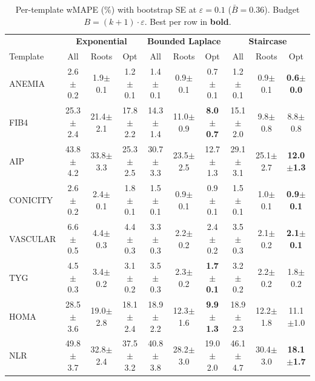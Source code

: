 \providecommand{\pmstd}[1]{{\scriptsize $\pm$#1}}

\begin{table}[t]
\centering
\setlength{\tabcolsep}{2.8pt}
\small
\caption{Per-template wMAPE (\%) with bootstrap SE at $\varepsilon = 0.1$ ($\bar{B} = 0.36$). Budget $B = (k+1) \cdot \varepsilon$. Best per row in \textbf{bold}.}
\label{tab:rq1_kplus1_per_tmpl_wmape}
\begin{tabular}{l|ccc|ccc|ccc}
\toprule
& \multicolumn{3}{c|}{\textbf{Exponential}} & \multicolumn{3}{c|}{\textbf{Bounded Laplace}} & \multicolumn{3}{c}{\textbf{Staircase}} \\
Template & All & Roots & Opt & All & Roots & Opt & All & Roots & Opt \\
\midrule
ANEMIA & 2.6\pmstd{0.2} & 1.9\pmstd{0.1} & 1.2\pmstd{0.1} & 1.4\pmstd{0.1} & 0.9\pmstd{0.1} & 0.7\pmstd{0.1} & 1.2\pmstd{0.1} & 0.9\pmstd{0.1} & \textbf{0.6\pmstd{0.0}} \\
FIB4 & 25.3\pmstd{2.4} & 21.4\pmstd{2.1} & 17.8\pmstd{2.2} & 14.3\pmstd{1.4} & 11.0\pmstd{0.9} & \textbf{8.0\pmstd{0.7}} & 15.1\pmstd{2.0} & 9.8\pmstd{0.8} & 8.8\pmstd{0.8} \\
AIP & 43.8\pmstd{4.2} & 33.8\pmstd{3.3} & 25.3\pmstd{2.5} & 30.7\pmstd{3.3} & 23.5\pmstd{2.5} & 12.7\pmstd{1.3} & 29.1\pmstd{3.1} & 25.1\pmstd{2.7} & \textbf{12.0\pmstd{1.3}} \\
CONICITY & 2.6\pmstd{0.2} & 2.4\pmstd{0.1} & 1.8\pmstd{0.1} & 1.5\pmstd{0.1} & 0.9\pmstd{0.1} & 0.9\pmstd{0.1} & 1.5\pmstd{0.1} & 1.0\pmstd{0.1} & \textbf{0.9\pmstd{0.1}} \\
VASCULAR & 6.6\pmstd{0.5} & 4.4\pmstd{0.3} & 4.4\pmstd{0.3} & 3.3\pmstd{0.3} & 2.2\pmstd{0.2} & 2.4\pmstd{0.2} & 3.5\pmstd{0.3} & 2.1\pmstd{0.2} & \textbf{2.1\pmstd{0.1}} \\
TYG & 4.5\pmstd{0.3} & 3.4\pmstd{0.2} & 3.1\pmstd{0.2} & 3.5\pmstd{0.3} & 2.3\pmstd{0.2} & \textbf{1.7\pmstd{0.1}} & 3.2\pmstd{0.2} & 2.2\pmstd{0.2} & 1.8\pmstd{0.2} \\
HOMA & 28.5\pmstd{3.6} & 19.0\pmstd{2.8} & 18.1\pmstd{2.4} & 18.9\pmstd{2.2} & 12.3\pmstd{1.6} & \textbf{9.9\pmstd{1.3}} & 18.9\pmstd{2.3} & 12.2\pmstd{1.8} & 11.1\pmstd{1.0} \\
NLR & 49.8\pmstd{3.7} & 32.8\pmstd{2.4} & 37.5\pmstd{3.2} & 40.8\pmstd{3.8} & 28.2\pmstd{3.0} & 19.0\pmstd{2.0} & 46.1\pmstd{4.7} & 30.4\pmstd{3.0} & \textbf{18.1\pmstd{1.7}} \\
\bottomrule
\end{tabular}
\end{table}
